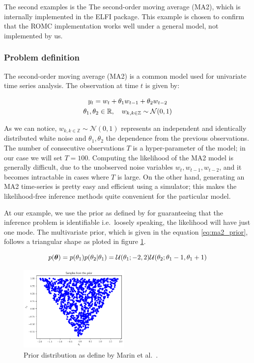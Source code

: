 The second examples is the The second-order moving average (MA2),
which is internally implemented in the ELFI package. This example is
chosen to confirm that the ROMC implementation works well under a
general model, not implemented by us.

\subsubsection*{Problem definition}

The second-order moving average (MA2) is a common model used for
univariate time series analysis. The observation at time $t$ is given by:

\begin{gather} \label{eq:ma2}
y_t = w_t + \theta_1 w_{t-1} + \theta_2 w_{t-2}\\
\theta_1, \theta_2 \in \mathbb{R}, \quad  w_{k, k \in \mathbb{Z}} \sim \mathcal{N}(0,1)
\end{gather}

As we can notice, $w_{k, k \in \mathbb{Z}} \sim \mathcal{N}(0,1)$
represents an independent and identically distributed white noise and
$\theta_1, \theta_2$ the dependence from the previous
observations. The number of consecutive observations $T$ is a
hyper-parameter of the model; in our case we will set
$T=100$. Computing the likelihood of the MA2 model is generally
difficult, due to the unobserved noise variables
$w_t, w_{t-1}, w_{t-2}$, and it becomes intractable in cases where $T$
is large. On the other hand, generating an MA2 time-series is pretty
easy and efficient using a simulator; this makes the likelihood-free
inference methods quite convenient for the particular model.

At our example, we use the prior as defined by \autocite{Marin2012}
for guaranteeing that the inference problem is identifiable i.e.\
loosely speaking, the likelihood will have just one mode. The
multivariate prior, which is given in the equation
\eqref{eq:ma2_prior}, follows a triangular shape as ploted in figure
\ref{fig:ma2_1}.

\begin{equation} \label{eq:ma2_prior}
p(\boldsymbol{\theta}) = p(\theta_1)p(\theta_2|\theta_1)
= \mathcal{U}(\theta_1;-2,2)\mathcal{U}(\theta_2;\theta_1-1, \theta_1+1)
\end{equation}

\begin{figure}[h]
    \begin{center}
      \includegraphics[width=0.48\textwidth]{./Thesis/images/chapter4/mae2_prior_samples.png}
    \end{center}
  \caption{Prior distribution as define by Marin et al.\ \autocite{Marin2012}.}
  \label{fig:ma2_1}
\end{figure}

